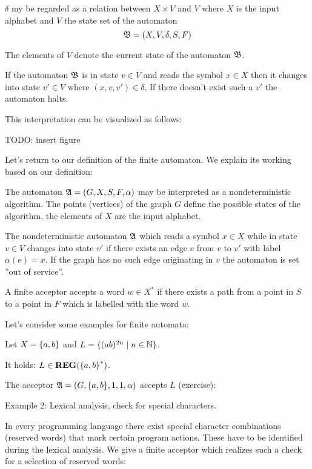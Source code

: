 $\delta$ my be regarded as a relation between $X \times V$ and $V$ where $X$ is
the input alphabet and $V$ the state set of the automaton \[ \mbox{$\mathfrak{B}$} = (X,
V, \delta, S, F) \]

The elements of $V$ denote the current state of the automaton $\mbox{$\mathfrak{B}$}$.

If the automaton $\mbox{$\mathfrak{B}$}$ is in state $v \in V$ and reads the symbol $x
\in X$ then it changes into state $v' \in V$ where $(x, v, v') \in \delta$. If
there doesn't exist such a $v'$ the automaton halts.

This interpretation can be visualized as follows:

TODO: insert figure

Let's return to our definition of the finite automaton. We explain its
working based on our definition:

The automaton $\mbox{$\mathfrak{A}$} = (G, X, S, F, \alpha)$ may be interpreted as a
nondeterministic algorithm. The points (vertices) of the graph $G$ define the
possible states of the algorithm, the elements of $X$ are the input alphabet.

The nondeterministic automaton $\mbox{$\mathfrak{A}$}$ which reads a symbol $x \in X$
while in state $v \in V$ changes into state $v'$ if there exists an edge $e$
from $v$ to $v'$ with label $\alpha(e) = x$. If the graph has no such edge
originating in $v$ the automaton is set ''out of service''.

A finite acceptor accepts a word $w \in X^*$ if there exists a path from a point
in $S$ to a point in $F$ which is labelled with the word $w$.

Let's consider some examples for finite automata:

\begin{example}
Let $X = \mbox{$\{a, b\}$}$ and $L = \mbox{$\{(a b)^{2n} \mid n \in
\mathbb{N}\}$}$.

It holds: $L \in \mbox{{\bf REG}}(\mbox{$\{a, b\}$}^*)$.

The acceptor $\mbox{$\mathfrak{A}$} = (G, \mbox{$\{a, b\}$}, {1}, {1}, \alpha)$ accepts $L$
(exercise):
\begin{center}

\end{center}
\end{example}

\bigskip
Example 2: Lexical analysis, check for special characters.

In every programming language there exist special character combinations
(reserved words) that mark certain program actions. These have to be identified
during the lexical analysis. We give a finite acceptor which realizes such a check for a selection
of reserved words:

